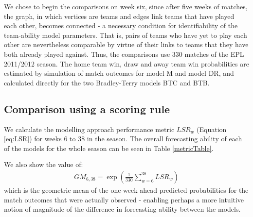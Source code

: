 We chose to begin the comparisons on week six, since after five weeks of matches, the graph, in which vertices are teams
and edges link teams that have played each other, becomes connected - a necessary condition for identifiability of the
team-ability model parameters. That is, pairs of teams who have yet to play each other are nevertheless comparable by
virtue of their links to teams that they have both already played against. Thus, the comparisons use 330 matches of the
\gls{EPL} 2011/2012 season. The home team win, draw and away team win probabilities are estimated by simulation of match
outcomes for model M and model DR, and calculated directly for the two Bradley-Terry models BTC and BTB.

\subsection{Comparison using a scoring rule}
\label{sec:Comparison_using_a_scoring_rule}

We calculate the modelling approach performance metric \(LSR_w\) (Equation \eqref{eq:LSR}) for weeks 6 to 38 in the
season. The overall forecasting ability of each of the models for the whole season can be seen in Table
\ref{metricTable}.
\begin{table}
\centering
{}
\caption{\label{metricTable} A comparison of the four competing models in terms of the sum of the logarithmic scoring
rule and the geometric mean of the one-week ahead predicted probabilities for the match outcomes that were actually
observed, for weeks 6 to 38}
\end{table}
We also show the value of:
\begin{align} 
GM_{6, 38} = \exp(\frac{1}{330} \sum_{w=6}^{38} LSR_w)
\end{align}
which is the geometric mean of the one-week ahead predicted probabilities for the match outcomes that were actually
observed - enabling perhaps a more intuitive notion of magnitude of the difference in forecasting ability between the
models.

